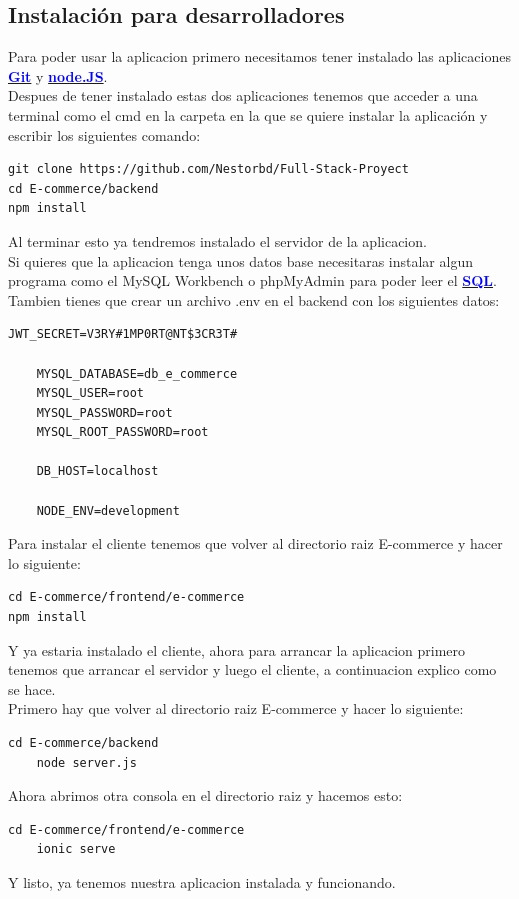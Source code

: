 \documentclass{article}
\begin{document}
\subsection{Instalación para desarrolladores}
\quad Para poder usar la aplicacion primero necesitamos tener instalado las aplicaciones \href{https://git-scm.com/downloads}{\textbf{\textcolor{blue}{Git}}} y \href{https://nodejs.org/es/download/}{\textbf{\textcolor{blue}{node.JS}}}.\\
Despues de tener instalado estas dos aplicaciones tenemos que acceder a una terminal como el cmd en la carpeta en la que se quiere instalar la aplicación y escribir los siguientes comando:\\
\lstset{breaklines=true, basicstyle=\footnotesize}
\begin{lstlisting}[frame=single]
git clone https://github.com/Nestorbd/Full-Stack-Proyect
cd E-commerce/backend
npm install
\end{lstlisting}
Al terminar esto ya tendremos instalado el servidor de la aplicacion.\\
Si quieres que la aplicacion tenga unos datos base necesitaras instalar algun programa como el MySQL Workbench o phpMyAdmin para poder leer el \href{https://github.com/Nestorbd/Full-Stack-Proyect/blob/master/E-commerce/DB_e_comerce.sql}{\textbf{\textcolor{blue}{SQL}}}.\\
Tambien tienes que crear un archivo .env en el backend con los siguientes datos:
\lstset{breaklines=true, basicstyle=\footnotesize}
\begin{lstlisting}[frame=single]
    JWT_SECRET=V3RY#1MP0RT@NT$3CR3T#

    MYSQL_DATABASE=db_e_commerce
    MYSQL_USER=root
    MYSQL_PASSWORD=root
    MYSQL_ROOT_PASSWORD=root
    
    DB_HOST=localhost
    
    NODE_ENV=development
\end{lstlisting}
Para instalar el cliente tenemos que volver al directorio raiz E-commerce y hacer lo siguiente:
\lstset{breaklines=true, basicstyle=\footnotesize}
\begin{lstlisting}[frame=single]
cd E-commerce/frontend/e-commerce
npm install
\end{lstlisting}
Y ya estaria instalado el cliente, ahora para arrancar la aplicacion primero tenemos que arrancar el servidor y luego el cliente, a continuacion explico como se hace.\\
Primero hay que volver al directorio raiz E-commerce y hacer lo siguiente:
\lstset{breaklines=true, basicstyle=\footnotesize}
\begin{lstlisting}[frame=single]
    cd E-commerce/backend
    node server.js
    \end{lstlisting}
Ahora abrimos otra consola en el directorio raiz y hacemos esto:
\lstset{breaklines=true, basicstyle=\footnotesize}
\begin{lstlisting}[frame=single]
    cd E-commerce/frontend/e-commerce
    ionic serve
    \end{lstlisting}
Y listo, ya tenemos nuestra aplicacion instalada y funcionando.
\end{document}
